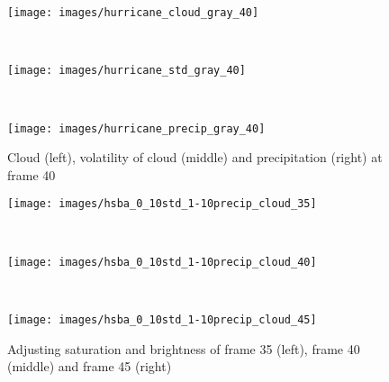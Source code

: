 \begin{figure}
\centering
\begin{minipage}{.15\textwidth}
\texttt{[image: images/hurricane\_cloud\_gray\_40]}
\end{minipage}~
\begin{minipage}{.15\textwidth}
\texttt{[image: images/hurricane\_std\_gray\_40]}
\end{minipage}~
\begin{minipage}{.15\textwidth}
\centering
\texttt{[image: images/hurricane\_precip\_gray\_40]}
\end{minipage}
\caption{Cloud (left), volatility of cloud (middle) and precipitation (right) at frame 40}
\label{fig:hurricane_gray}
\end{figure}

\begin{figure}
\centering
\begin{minipage}{.15\textwidth}
\centering
\texttt{[image: images/hsba\_0\_10std\_1-10precip\_cloud\_35]}
\end{minipage}~
\begin{minipage}{.15\textwidth}
\centering
\texttt{[image: images/hsba\_0\_10std\_1-10precip\_cloud\_40]}
\end{minipage}~
\begin{minipage}{.15\textwidth}
\centering
\texttt{[image: images/hsba\_0\_10std\_1-10precip\_cloud\_45]}
\end{minipage}
\caption{Adjusting saturation and brightness of frame 35 (left), frame 40 (middle) and frame 45 (right)}
\label{fig:hurricane_frames}
\end{figure}

